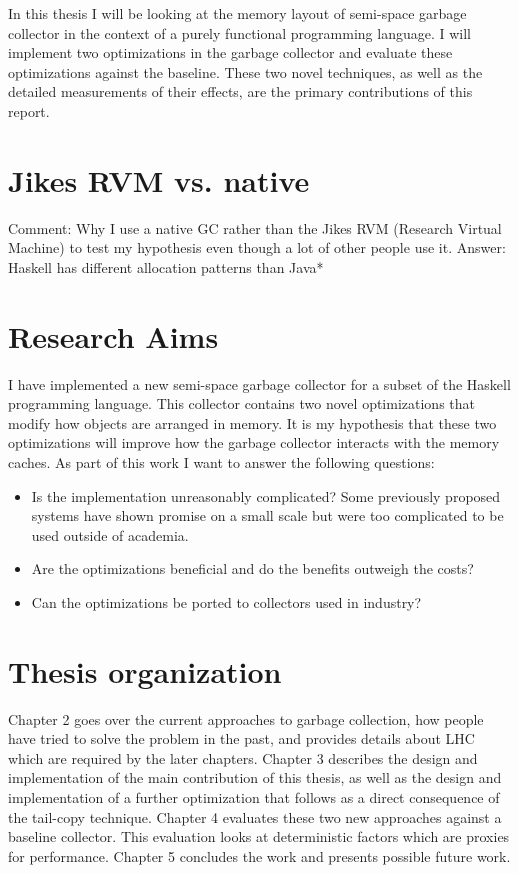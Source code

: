\documentclass[a4paper,oneside]{memoir}
\newcommand{\makecomment}[1]{{\color{red} Comment: #1}}
\begin{document}
In this thesis I will be looking at the memory layout of semi-space garbage
collector in the context of a purely functional programming language.
I will implement two optimizations in the garbage collector and evaluate these
optimizations against the baseline. These two novel techniques, as well as the
detailed measurements of their effects, are the primary contributions of this
report.

\section{Jikes RVM vs. native}
\makecomment{Why I use a native GC rather than the Jikes RVM (Research Virtual Machine)
to test my hypothesis even though a lot of other people use it.
Answer: Haskell has different allocation patterns than Java*}

\section{Research Aims}
I have implemented a new semi-space garbage collector for a subset of the
Haskell programming language. This collector contains two novel optimizations
that modify how objects are arranged in memory. It is my hypothesis that these
two optimizations will improve how the garbage collector interacts with the
memory caches. As part of this work I want to answer the following questions:
\begin{itemize}
  \item Is the implementation unreasonably complicated? Some previously proposed
    systems have shown promise on a small scale but were too complicated to be
    used outside of academia.
  \item Are the optimizations beneficial and do the benefits outweigh the costs?
  \item Can the optimizations be ported to collectors used in industry?
\end{itemize}

\section{Thesis organization}
Chapter 2 goes over the current approaches to garbage collection, how people
have tried to solve the problem in the past, and provides details about
LHC which are required by the later chapters.
Chapter 3 describes the design and implementation of the main contribution of
this thesis, as well as the design and implementation of a further optimization
that follows as a direct consequence of the tail-copy technique.
Chapter 4 evaluates these two new approaches against a baseline collector. This
evaluation looks at deterministic factors which are proxies for performance.
Chapter 5 concludes the work and presents possible future work.
\end{document}
